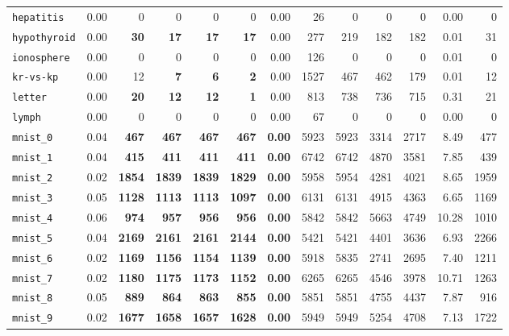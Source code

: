 \begin{tabular}{lrrrrrrrrrrrr}
\texttt{hepatitis} & 0.00 & 0 & 0 & 0 & 0 & 0.00 & 26 & 0 & 0 & 0 & 0.00 & 0\\
\texttt{hypothyroid} & 0.00 & \textbf{30} & \textbf{17} & \textbf{17} & \textbf{17} & 0.00 & 277 & 219 & 182 & 182 & 0.01 & 31\\
\texttt{ionosphere} & 0.00 & 0 & 0 & 0 & 0 & 0.00 & 126 & 0 & 0 & 0 & 0.01 & 0\\
\texttt{kr-vs-kp} & 0.00 & 12 & \textbf{7} & \textbf{6} & \textbf{2} & 0.00 & 1527 & 467 & 462 & 179 & 0.01 & 12\\
\texttt{letter} & 0.00 & \textbf{20} & \textbf{12} & \textbf{12} & \textbf{1} & 0.00 & 813 & 738 & 736 & 715 & 0.31 & 21\\
\texttt{lymph} & 0.00 & 0 & 0 & 0 & 0 & 0.00 & 67 & 0 & 0 & 0 & 0.00 & 0\\
\texttt{mnist\_0} & 0.04 & \textbf{467} & \textbf{467} & \textbf{467} & \textbf{467} & \textbf{0.00} & 5923 & 5923 & 3314 & 2717 & 8.49 & 477\\
\texttt{mnist\_1} & 0.04 & \textbf{415} & \textbf{411} & \textbf{411} & \textbf{411} & \textbf{0.00} & 6742 & 6742 & 4870 & 3581 & 7.85 & 439\\
\texttt{mnist\_2} & 0.02 & \textbf{1854} & \textbf{1839} & \textbf{1839} & \textbf{1829} & \textbf{0.00} & 5958 & 5954 & 4281 & 4021 & 8.65 & 1959\\
\texttt{mnist\_3} & 0.05 & \textbf{1128} & \textbf{1113} & \textbf{1113} & \textbf{1097} & \textbf{0.00} & 6131 & 6131 & 4915 & 4363 & 6.65 & 1169\\
\texttt{mnist\_4} & 0.06 & \textbf{974} & \textbf{957} & \textbf{956} & \textbf{956} & \textbf{0.00} & 5842 & 5842 & 5663 & 4749 & 10.28 & 1010\\
\texttt{mnist\_5} & 0.04 & \textbf{2169} & \textbf{2161} & \textbf{2161} & \textbf{2144} & \textbf{0.00} & 5421 & 5421 & 4401 & 3636 & 6.93 & 2266\\
\texttt{mnist\_6} & 0.02 & \textbf{1169} & \textbf{1156} & \textbf{1154} & \textbf{1139} & \textbf{0.00} & 5918 & 5835 & 2741 & 2695 & 7.40 & 1211\\
\texttt{mnist\_7} & 0.02 & \textbf{1180} & \textbf{1175} & \textbf{1173} & \textbf{1152} & \textbf{0.00} & 6265 & 6265 & 4546 & 3978 & 10.71 & 1263\\
\texttt{mnist\_8} & 0.05 & \textbf{889} & \textbf{864} & \textbf{863} & \textbf{855} & \textbf{0.00} & 5851 & 5851 & 4755 & 4437 & 7.87 & 916\\
\texttt{mnist\_9} & 0.02 & \textbf{1677} & \textbf{1658} & \textbf{1657} & \textbf{1628} & \textbf{0.00} & 5949 & 5949 & 5254 & 4708 & 7.13 & 1722\\

\end{tabular}
